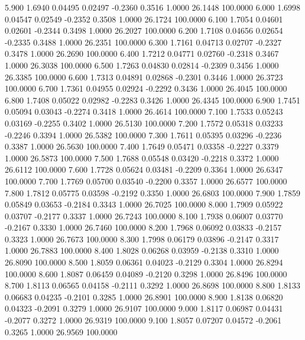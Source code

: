    5.900   1.6940   0.04495   0.02497  -0.2360   0.3516   1.0000  26.1448 100.0000
   6.000   1.6998   0.04547   0.02549  -0.2352   0.3508   1.0000  26.1724 100.0000
   6.100   1.7054   0.04601   0.02601  -0.2344   0.3498   1.0000  26.2027 100.0000
   6.200   1.7108   0.04656   0.02654  -0.2335   0.3488   1.0000  26.2351 100.0000
   6.300   1.7161   0.04713   0.02707  -0.2327   0.3478   1.0000  26.2690 100.0000
   6.400   1.7212   0.04771   0.02760  -0.2318   0.3467   1.0000  26.3038 100.0000
   6.500   1.7263   0.04830   0.02814  -0.2309   0.3456   1.0000  26.3385 100.0000
   6.600   1.7313   0.04891   0.02868  -0.2301   0.3446   1.0000  26.3723 100.0000
   6.700   1.7361   0.04955   0.02924  -0.2292   0.3436   1.0000  26.4045 100.0000
   6.800   1.7408   0.05022   0.02982  -0.2283   0.3426   1.0000  26.4345 100.0000
   6.900   1.7451   0.05094   0.03043  -0.2274   0.3418   1.0000  26.4614 100.0000
   7.100   1.7533   0.05243   0.03169  -0.2255   0.3402   1.0000  26.5130 100.0000
   7.200   1.7572   0.05318   0.03233  -0.2246   0.3394   1.0000  26.5382 100.0000
   7.300   1.7611   0.05395   0.03296  -0.2236   0.3387   1.0000  26.5630 100.0000
   7.400   1.7649   0.05471   0.03358  -0.2227   0.3379   1.0000  26.5873 100.0000
   7.500   1.7688   0.05548   0.03420  -0.2218   0.3372   1.0000  26.6112 100.0000
   7.600   1.7728   0.05624   0.03481  -0.2209   0.3364   1.0000  26.6347 100.0000
   7.700   1.7769   0.05700   0.03540  -0.2200   0.3357   1.0000  26.6577 100.0000
   7.800   1.7812   0.05775   0.03598  -0.2192   0.3350   1.0000  26.6803 100.0000
   7.900   1.7859   0.05849   0.03653  -0.2184   0.3343   1.0000  26.7025 100.0000
   8.000   1.7909   0.05922   0.03707  -0.2177   0.3337   1.0000  26.7243 100.0000
   8.100   1.7938   0.06007   0.03770  -0.2167   0.3330   1.0000  26.7460 100.0000
   8.200   1.7968   0.06092   0.03833  -0.2157   0.3323   1.0000  26.7673 100.0000
   8.300   1.7998   0.06179   0.03896  -0.2147   0.3317   1.0000  26.7883 100.0000
   8.400   1.8028   0.06268   0.03959  -0.2138   0.3310   1.0000  26.8090 100.0000
   8.500   1.8059   0.06361   0.04023  -0.2129   0.3304   1.0000  26.8294 100.0000
   8.600   1.8087   0.06459   0.04089  -0.2120   0.3298   1.0000  26.8496 100.0000
   8.700   1.8113   0.06565   0.04158  -0.2111   0.3292   1.0000  26.8698 100.0000
   8.800   1.8133   0.06683   0.04235  -0.2101   0.3285   1.0000  26.8901 100.0000
   8.900   1.8138   0.06820   0.04323  -0.2091   0.3279   1.0000  26.9107 100.0000
   9.000   1.8117   0.06987   0.04431  -0.2077   0.3272   1.0000  26.9319 100.0000
   9.100   1.8057   0.07207   0.04572  -0.2061   0.3265   1.0000  26.9569 100.0000

